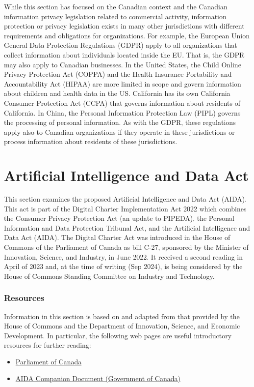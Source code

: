 While this section has focused on the Canadian context and the Canadian information privacy legislation related to commercial activity, information protection or privacy legislation exists in many other jurisdictions with different requirements and obligations for organizations. For example, the European Union General Data Protection Regulations (GDPR) apply to all organizations that collect information about individuals located inside the EU. That is, the GDPR may also apply to Canadian businesses. In the United States, the Child Online Privacy Protection Act (COPPA) and the Health Insurance Portability and Accountability Act (HIPAA) are more limited in scope and govern information about children and health data in the US. California has its own California Consumer Protection Act (CCPA) that governs information about residents of California. In China, the Personal Information Protection Law (PIPL) governs the processing of personal information. As with the GDPR, these regulations apply also to Canadian organizations if they operate in these jurisdictions or process information about residents of these jurisdictions.

\section{Artificial Intelligence and Data Act}

This section examines the proposed Artificial Intelligence and Data Act (AIDA). This act is part of the Digital Charter Implementation Act 2022 which combines the Consumer Privacy Protection Act (an update to PIPEDA), the Personal Information and Data Protection Tribunal Act, and the Artificial Intelligence and Data Act (AIDA). The Digital Charter Act was introduced in the House of Commons of the Parliament of Canada as bill C-27, sponsored by the Minister of Innovation, Science, and Industry, in June 2022. It received a second reading in April of 2023 and, at the time of writing (Sep 2024), is being considered by the House of Commons Standing Committee on Industry and Technology. 

\begin{tcolorbox}[colback=alert]
\subsubsection*{Resources}
Information in this section is based on and adapted from that provided by the House of Commons and the Department of Innovation, Science, and Economic Development. In particular, the following web pages are useful introductory resources for further reading:
\begin{itemize}
\item \href{https://www.parl.ca/legisinfo/en/bill/44-1/c-27}{Parliament of Canada}
\item \href{https://ised-isde.canada.ca/site/innovation-better-canada/en/artificial-intelligence-and-data-act-aida-companion-document}{AIDA Companion Document (Government of Canada)}
\end{itemize}
\end{tcolorbox}

